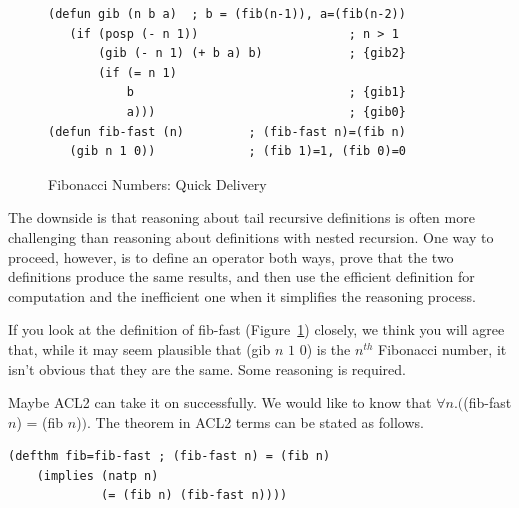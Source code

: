 \begin{figure}
\begin{center}
\begin{Verbatim}
(defun gib (n b a)  ; b = (fib(n-1)), a=(fib(n-2))
   (if (posp (- n 1))                     ; n > 1
       (gib (- n 1) (+ b a) b)            ; {gib2}
       (if (= n 1)
           b                              ; {gib1}
           a)))                           ; {gib0}
(defun fib-fast (n)         ; (fib-fast n)=(fib n)
   (gib n 1 0))             ; (fib 1)=1, (fib 0)=0
\end{Verbatim}
\end{center}
\caption{Fibonacci Numbers: Quick Delivery}
\label{fig:gib-defun}
\end{figure}

The downside is that reasoning
about tail recursive
definitions is often more challenging than reasoning about definitions
with nested recursion. One way to proceed, however,
is to define an operator both ways, prove that the two definitions
produce the same results, and then use the efficient definition
for computation and the inefficient one when it
simplifies the reasoning process.

If you look at the definition of fib-fast (Figure~\ref{fig:gib-defun})
closely, we think you will agree that, while it may seem plausible
that (gib $n$ $1$ $0$) is the $n^{th}$ Fibonacci number,
it isn't obvious that they are the same.
Some reasoning is required.

Maybe ACL2 can take it on successfully.
We would like to know that $\forall n.($(fib-fast $n$) = (fib $n$)$)$.
The theorem in ACL2 terms can be stated as follows.
\begin{samepage}
\begin{center}
\begin{Verbatim}
(defthm fib=fib-fast ; (fib-fast n) = (fib n)
    (implies (natp n)
             (= (fib n) (fib-fast n))))
\end{Verbatim}
\end{center}
\end{samepage}

